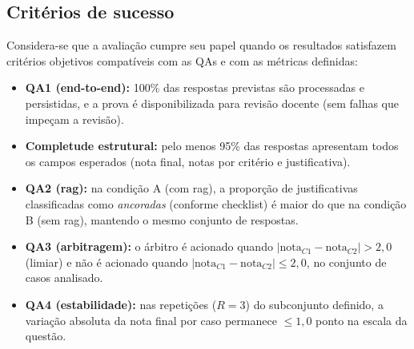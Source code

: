 \subsection{Critérios de sucesso}
Considera-se que a avaliação cumpre seu papel quando os resultados satisfazem critérios objetivos compatíveis com as QAs e com as métricas definidas:

\begin{itemize}
    \item \textbf{QA1 (end-to-end):} 100\% das respostas previstas são processadas e persistidas, e a prova é disponibilizada para revisão docente (sem falhas que impeçam a revisão).
    \item \textbf{Completude estrutural:} pelo menos 95\% das respostas apresentam todos os campos esperados (nota final, notas por critério e justificativa).
    \item \textbf{QA2 (\gls{rag}):} na condição A (com \gls{rag}), a proporção de justificativas classificadas como \textit{ancoradas} (conforme checklist) é maior do que na condição B (sem \gls{rag}), mantendo o mesmo conjunto de respostas.
    \item \textbf{QA3 (arbitragem):} o árbitro é acionado quando \(|\mathrm{nota}_{C1}-\mathrm{nota}_{C2}|> 2{,}0\) (limiar) e não é acionado quando \(|\mathrm{nota}_{C1}-\mathrm{nota}_{C2}|\leq 2{,}0\), no conjunto de casos analisado.
    \item \textbf{QA4 (estabilidade):} nas repetições (\(R=3\)) do subconjunto definido, a variação absoluta da nota final por caso permanece \(\leq 1{,}0\) ponto na escala da questão.
\end{itemize}

